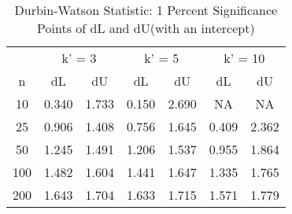 \documentclass[
  12pt,
]{article}
\begin{document}
\begin{table}[htb] \centering 
    \caption{Durbin-Watson Statistic: 1 Percent Significance Points of dL and dU(with an intercept)} 
    \label{DWintercept} 
    \small 
    \begin{tabular}{@{}ccccccc@{}}
        \cmidrule(r){1-7}
        & \multicolumn{2}{c}{k' = 3}                  & \multicolumn{2}{c}{k' = 5}                  & \multicolumn{2}{c}{k' = 10}                 \\ \cmidrule(r){1-7}
        n                    & dL                   & dU                   & dL                   & dU                   & dL                   & dU                   \\
        10                   & 0.340                & 1.733                & 0.150                & 2.690                & NA                   & NA                   \\
        25                   & 0.906                & 1.408                & 0.756                & 1.645                & 0.409                & 2.362                \\
        50                   & 1.245                & 1.491                & 1.206                & 1.537                & 0.955                & 1.864                \\
        100                  & 1.482                & 1.604                & 1.441                & 1.647                & 1.335                & 1.765                \\
        200                  & 1.643                & 1.704                & 1.633                & 1.715                & 1.571                & 1.779                \\ \cmidrule(r){1-7}
    \end{tabular}
\end{table}
\end{document}
